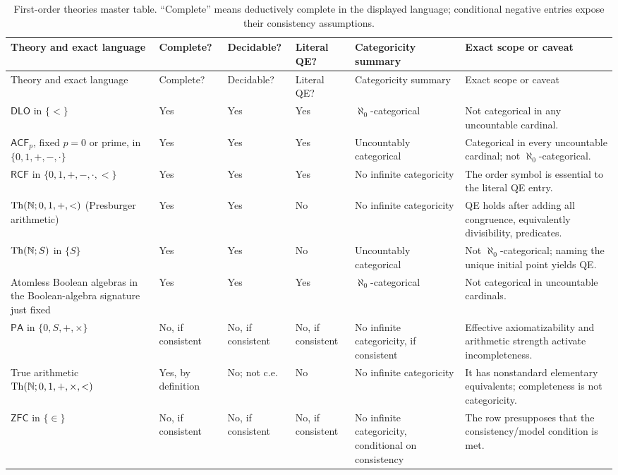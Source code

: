 \begin{landscape}
\begingroup\tiny\setlength{\tabcolsep}{3pt}
\begin{longtable}{@{}p{1.15in}p{1.05in}p{.62in}p{.65in}p{.95in}p{2.64in}@{}}
\caption{First-order theories master table.  ``Complete''
means deductively complete in the displayed language; conditional negative
entries expose their consistency assumptions.}
\label{tab:p03-first-order-theories}\\
\toprule
Theory and exact language & Complete? & Decidable? & Literal QE? & Categoricity summary & Exact scope or caveat \\
\midrule\endfirsthead
\toprule
Theory and exact language & Complete? & Decidable? & Literal QE? & Categoricity summary & Exact scope or caveat \\
\midrule\endhead
\(\mathsf{DLO}\) in \(\{<\}\) & Yes & Yes & Yes & \(\aleph_0\)-categorical & Not categorical in any uncountable cardinal. \\
\addlinespace
\(\mathsf{ACF}_p\), fixed \(p=0\) or prime, in \(\{0,1,+,-,\mathbin{\cdot}\}\) & Yes & Yes & Yes & Uncountably categorical & Categorical in every uncountable cardinal; not \(\aleph_0\)-categorical. \\
\addlinespace
\(\mathsf{RCF}\) in \(\{0,1,+,-,\mathbin{\cdot},<\}\) & Yes & Yes & Yes & No infinite categoricity & The order symbol is essential to the literal QE entry. \\
\addlinespace
\(\operatorname{Th}(\mathbb{N};0,1,+,<)\) (Presburger arithmetic) & Yes & Yes & No & No infinite categoricity & QE holds after adding all congruence, equivalently divisibility, predicates. \\
\addlinespace
\(\operatorname{Th}(\mathbb{N};S)\) in \(\{S\}\) & Yes & Yes & No & Uncountably categorical & Not \(\aleph_0\)-categorical; naming the unique initial point yields QE. \\
\addlinespace
Atomless Boolean algebras in the Boolean-algebra signature just fixed & Yes & Yes & Yes & \(\aleph_0\)-categorical & Not categorical in uncountable cardinals. \\
\addlinespace
\(\mathsf{PA}\) in \(\{0,S,+,\times\}\) & No, if consistent & No, if consistent & No, if consistent & No infinite categoricity, if consistent & Effective axiomatizability and arithmetic strength activate incompleteness. \\
\addlinespace
True arithmetic \(\operatorname{Th}(\mathbb{N};0,1,+,\times,<)\) & Yes, by definition & No; not c.e. & No & No infinite categoricity & It has nonstandard elementary equivalents; completeness is not categoricity. \\
\addlinespace
\(\mathsf{ZFC}\) in \(\{\in\}\) & No, if consistent & No, if consistent & No, if consistent & No infinite categoricity, conditional on consistency & The row presupposes that the consistency/model condition is met. \\
\bottomrule
\end{longtable}
\endgroup
\end{landscape}

